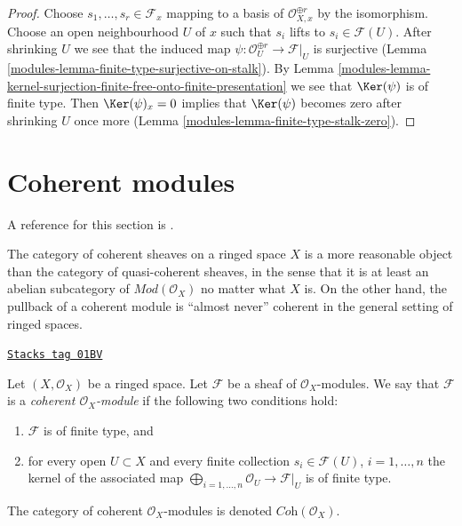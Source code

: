 \begin{proof}

Choose $s_1, \ldots, s_r \in \mathcal{F}_x$ mapping to a basis of
$\mathcal{O}_{X, x}^{\oplus r}$ by the isomorphism. Choose an open
neighbourhood $U$ of $x$ such that $s_i$ lifts to $s_i \in \mathcal{F}(U)$.
After shrinking $U$ we see that the induced map
$\psi : \mathcal{O}_U^{\oplus r} \to \mathcal{F}|_U$ is surjective
(Lemma \ref{modules-lemma-finite-type-surjective-on-stalk}).
By Lemma \ref{modules-lemma-kernel-surjection-finite-free-onto-finite-presentation}
we see that $\Ker(\psi)$ is of finite type.
Then $\Ker(\psi)_x = 0$ implies that $\Ker(\psi)$ becomes zero
after shrinking $U$ once more (Lemma \ref{modules-lemma-finite-type-stalk-zero}).
\end{proof}

\section{Coherent modules}
\label{modules-section-coherent}
A reference for this section is \cite{FAC}.

\medskip\noindent
The category of coherent sheaves on a ringed space $X$
is a more reasonable object
than the category of quasi-coherent sheaves, in the sense
that it is at least an abelian subcategory of $\textit{Mod}(\mathcal{O}_X)$
no matter what $X$ is. On the other hand, the pullback of a
coherent module is ``almost never'' coherent in the general setting
of ringed spaces.

\begin{definition}[Coherent]
\label{modules-definition-coherent}
\href{https://stacks.math.columbia.edu/tag/01BV}{\texttt{Stacks tag 01BV}}

Let $(X, \mathcal{O}_X)$ be a ringed space.
Let $\mathcal{F}$ be a sheaf of $\mathcal{O}_X$-modules.
We say that $\mathcal{F}$ is a {\it coherent $\mathcal{O}_X$-module}
if the following two conditions hold:
\begin{enumerate}
\item $\mathcal{F}$ is of finite type, and
\item for every open $U \subset X$ and every finite
collection $s_i \in \mathcal{F}(U)$, $i = 1, \ldots, n$
the kernel of the associated map
$\bigoplus_{i = 1, \ldots, n} \mathcal{O}_U \to \mathcal{F}|_U$
is of finite type.
\end{enumerate}
The category of coherent $\mathcal{O}_X$-modules is denoted
$\textit{Coh}(\mathcal{O}_X)$.
\end{definition}

